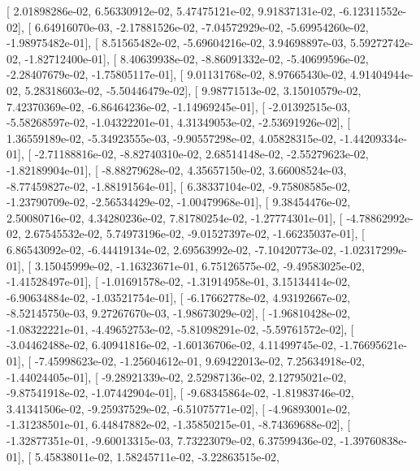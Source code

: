 \documentclass{article}
\begin{document}
       [  2.01898286e-02,   6.56330912e-02,   5.47475121e-02,
          9.91837131e-02,  -6.12311552e-02],
       [  6.64916070e-03,  -2.17881526e-02,  -7.04572929e-02,
         -5.69954260e-02,  -1.98975482e-01],
       [  8.51565482e-02,  -5.69604216e-02,   3.94698897e-03,
          5.59272742e-02,  -1.82712400e-01],
       [  8.40639938e-02,  -8.86091332e-02,  -5.40699596e-02,
         -2.28407679e-02,  -1.75805117e-01],
       [  9.01131768e-02,   8.97665430e-02,   4.91404944e-02,
          5.28318603e-02,  -5.50446479e-02],
       [  9.98771513e-02,   3.15010579e-02,   7.42370369e-02,
         -6.86464236e-02,  -1.14969245e-01],
       [ -2.01392515e-03,  -5.58268597e-02,  -1.04322201e-01,
          4.31349053e-02,  -2.53691926e-02],
       [  1.36559189e-02,  -5.34923555e-03,  -9.90557298e-02,
          4.05828315e-02,  -1.44209334e-01],
       [ -2.71188816e-02,  -8.82740310e-02,   2.68514148e-02,
         -2.55279623e-02,  -1.82189904e-01],
       [ -8.88279628e-02,   4.35657150e-02,   3.66008524e-03,
         -8.77459827e-02,  -1.88191564e-01],
       [  6.38337104e-02,  -9.75808585e-02,  -1.23790709e-02,
         -2.56534429e-02,  -1.00479968e-01],
       [  9.38454476e-02,   2.50080716e-02,   4.34280236e-02,
          7.81780254e-02,  -1.27774301e-01],
       [ -4.78862992e-02,   2.67545532e-02,   5.74973196e-02,
         -9.01527397e-02,  -1.66235037e-01],
       [  6.86543092e-02,  -6.44419134e-02,   2.69563992e-02,
         -7.10420773e-02,  -1.02317299e-01],
       [  3.15045999e-02,  -1.16323671e-01,   6.75126575e-02,
         -9.49583025e-02,  -1.41528497e-01],
       [ -1.01691578e-02,  -1.31914958e-01,   3.15134414e-02,
         -6.90634884e-02,  -1.03521754e-01],
       [ -6.17662778e-02,   4.93192667e-02,  -8.52145750e-03,
          9.27267670e-03,  -1.98673029e-02],
       [ -1.96810428e-02,  -1.08322221e-01,  -4.49652753e-02,
         -5.81098291e-02,  -5.59761572e-02],
       [ -3.04462488e-02,   6.40941816e-02,  -1.60136706e-02,
          4.11499745e-02,  -1.76695621e-01],
       [ -7.45998623e-02,  -1.25604612e-01,   9.69422013e-02,
          7.25634918e-02,  -1.44024405e-01],
       [ -9.28921339e-02,   2.52987136e-02,   2.12795021e-02,
         -9.87541918e-02,  -1.07442904e-01],
       [ -9.68345864e-02,  -1.81983746e-02,   3.41341506e-02,
         -9.25937529e-02,  -6.51075771e-02],
       [ -4.96893001e-02,  -1.31238501e-01,   6.44847882e-02,
         -1.35850215e-01,  -8.74369688e-02],
       [ -1.32877351e-01,  -9.60013315e-03,   7.73223079e-02,
          6.37599436e-02,  -1.39760838e-01],
       [  5.45838011e-02,   1.58245711e-02,  -3.22863515e-02,
\end{document}
